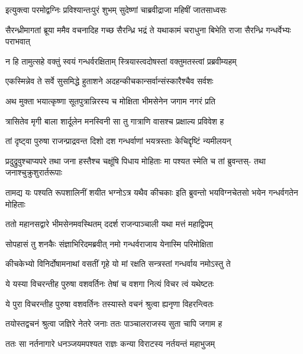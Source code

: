 \twolineshloka
{इत्युक्त्वा परमोद्वग्निः प्रविश्यान्तःपुरं शुभम्}
{सुदेष्णां चाब्रवीद्राजा महिषीं जातसाध्वसः}


\threelineshloka
{सैरन्ध्रीमागतां ब्रूया ममैव वचनादिह}
{गच्छ सैरन्ध्रि भद्रं ते यथाकामं चराधुना}
{बिभेति राजा सैरन्ध्रि गन्धर्वेभ्यः पराभवात्}


\twolineshloka
{न हि तामुत्सहे वक्तुं स्वयं गन्धर्वरक्षिताम्}
{स्त्रियास्त्वदोषस्तां वक्तुमतस्त्वां प्रब्रवीम्यहम्}



\twolineshloka
{एकस्मिन्नेव ते सर्वे सुसमिद्धे हुताशने}
{अदहन्कीचकान्सर्वान्संस्कारैश्चैव सर्वशः}


\twolineshloka
{अथ मुक्ता भयात्कृष्णा सूतपुत्रान्निरस्य च}
{मोक्षिता भीमसेनेन जगाम नगरं प्रति}


\twolineshloka
{त्रासितेव मृगी बाला शार्दूलेन मनस्विनी}
{सा तु गात्राणि वासश्च प्रक्षाल्य प्रविवेश ह}


\twolineshloka
{तां दृष्ट्वा पुरुषा राजन्प्राद्रवन्त दिशो दश}
{गन्धर्वाणां भयत्रस्ताः केचिद्दृष्टिं न्यमीलयन्}


\fourlineindentedshloka
{प्रदुद्रुवुश्चाप्यपरे तथा जना}
{हस्तैश्च चक्षूंषि पिधाय मोहिताः}
{मा पश्यत स्मेति च तां ब्रुवन्तस्-}
{तथा जनाश्चुक्रुशुरार्तरूपाः}


\fourlineindentedshloka
{तामद्य यः पश्यति रूपशालिनीं}
{शयीत भग्नोऽत्र यथैव कीचकाः}
{इति ब्रुवन्तो भयविग्नचेतसो}
{भयेन गन्धर्वगतेन मोहिताः}


\twolineshloka
{ततो महानसद्वारे भीमसेनमवस्थितम्}
{ददर्श राजन्पाञ्चाली यथा मत्तं महाद्विपम्}


\twolineshloka
{सोपहासं तु शनकैः संज्ञाभिरिदमब्रवीत्}
{नमो गन्धर्वराजाय येनास्मि परिमोक्षिता}


\twolineshloka
{कीचकेभ्यो विनिर्दोषामनाथां वसतीं गृहे}
{यो मां रक्षति सन्त्रस्तां गन्धर्वाय नमोऽस्तु ते}




\twolineshloka
{ये यस्या विचरन्तीह पुरुषा वशवर्तिनः}
{तेषां च वशगा नित्यं विचर त्वं यथेष्टतः}


\twolineshloka
{ये पुरा विचरन्तीह पुरुषा वशवर्तिनः}
{तस्यास्ते वचनं श्रुत्वा ह्यनृणा विहरन्त्वितः}



\twolineshloka
{तयोस्तद्वचनं श्रुत्वा जज्ञिरे नेतरे जनाः}
{ततः पाञ्चालराजस्य सुता चापि जगाम ह}


\twolineshloka
{ततः सा नर्तनागारे धनञ्जयमपश्यत}
{राज्ञः कन्या विराटस्य नर्तयन्तं महाभुजम्}


